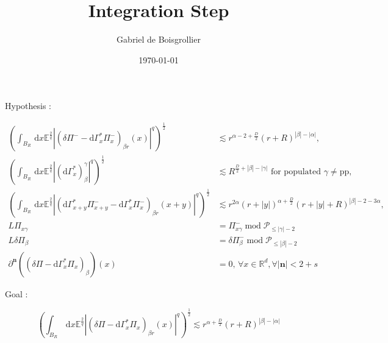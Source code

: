 \documentclass[12pt, a4paper]{article}
\title{Integration Step}
\author{Gabriel de Boisgrollier}
\date{\today}
\newcommand{\R}{\mathbb{R}}
\newcommand{\dG}{\mathrm{d}\Gamma^*_x}
\newcommand{\dGb}{\mathrm{d}\Gamma^*}
\newcommand{\mn}{\mathbf{n}}
\newcommand{\abs}[1]{\left| #1 \right|}
\newcommand{\dd}{\,\mathrm{d}}
\begin{document}
\maketitle
Hypothesis :

\begin{align}
    (\int_{B_R} \dd x \mathbb{E}^{\frac{2}{q}}\abs{(\delta \Pi^- - \dG \Pi_x^-)_{\beta r}(x)}^q)^\frac{1}{2} &\lesssim r^{\alpha - 2 + \frac{D}{2}}(r+R)^{\abs{\beta} - \abs{\alpha}}, \label{homogeneity_deltaPi_minus}\\
    (\int_{B_R} \dd x \mathbb{E}^{\frac{2}{q}}\abs{(\dG)^\gamma_\beta}^q)^\frac{1}{2} &\lesssim R^{\frac{D}{2}+\abs{\beta} - \abs{\gamma}} \text{ for populated }\gamma \neq \text{pp}, \label{coeff_estimate} \\
    (\int_{B_R} \dd x \mathbb{E}^{\frac{2}{q}}\abs{(\dGb_{x+y}\Pi_{x+y}^- - \dG \Pi_x^-)_{\beta r}(x+y)}^q)^\frac{1}{2} &\lesssim r^{2\alpha}(r+\abs{y})^{\alpha+\frac{D}{2}}(r+\abs{y}+R)^{\abs{\beta}-2-3\alpha}, \label{coherence_deltaPi_minus}\\
    L\Pi_{x\gamma} &= \Pi_{x\gamma}^- \operatorname*{mod} \mathcal{P}_{\leq\abs{\gamma}-2} \label{PDE_Pi} \\
    L\delta\Pi_{\beta} &= \delta\Pi_{\beta}^- \operatorname*{mod} \mathcal{P}_{\leq \abs{\beta}-2} \label{PDE_deltaPi}\\
    \partial^\mn((\delta \Pi - \dG \Pi_x)_\beta)(x) &= 0, \, \forall x \in \R^d, \forall \abs{\mn}<2+s \label{qualitative_vanishing}
\end{align}

Goal :

\begin{equation}
    \label{reconstruction_deltaPi}
        \left(\int_{B_R} \dd x \mathbb{E}^{\frac{2}{q}}\abs{(\delta \Pi - \dG \Pi_x)_{\beta r}(x)}^q \right)^\frac{1}{2} \lesssim r^{\alpha + \frac{D}{2}}(r+R)^{\abs{\beta} - \abs{\alpha}} 
\end{equation}
\end{document}
